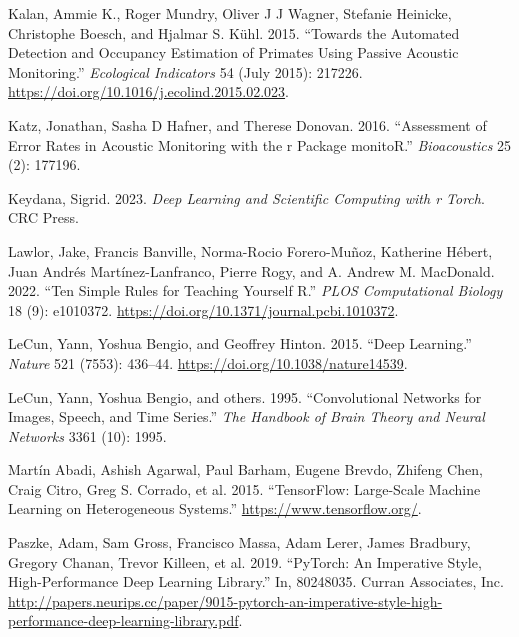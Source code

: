 \documentclass[fleqn,10pt,lineno]{wlpeerj} %
\newlength{\cslhangindent}
\newlength{\cslentryspacingunit} %
\newenvironment{CSLReferences}[2] %
 {%
  \setlength{\parindent}{0pt}
  \ifodd #1
  \let\oldpar\par
  \def\par{\hangindent=\cslhangindent\oldpar}
  \fi
  \setlength{\parskip}{#2\cslentryspacingunit}
 }%
 {}
\begin{document}
\begin{CSLReferences}{1}{0}
\leavevmode{}%
Kalan, Ammie K., Roger Mundry, Oliver J J Wagner, Stefanie Heinicke,
Christophe Boesch, and Hjalmar S. Kühl. 2015. {``Towards the Automated
Detection and Occupancy Estimation of Primates Using Passive Acoustic
Monitoring.''} \emph{Ecological Indicators} 54 (July 2015): 217226.
\url{https://doi.org/10.1016/j.ecolind.2015.02.023}.

\leavevmode{}%
Katz, Jonathan, Sasha D Hafner, and Therese Donovan. 2016. {``Assessment
of Error Rates in Acoustic Monitoring with the r Package monitoR.''}
\emph{Bioacoustics} 25 (2): 177196.

\leavevmode{}%
Keydana, Sigrid. 2023. \emph{Deep Learning and Scientific Computing with
r Torch}. CRC Press.

\leavevmode{}%
Lawlor, Jake, Francis Banville, Norma-Rocio Forero-Muñoz, Katherine
Hébert, Juan Andrés Martínez-Lanfranco, Pierre Rogy, and A. Andrew M.
MacDonald. 2022. {``Ten Simple Rules for Teaching Yourself R.''}
\emph{PLOS Computational Biology} 18 (9): e1010372.
\url{https://doi.org/10.1371/journal.pcbi.1010372}.

\leavevmode{}%
LeCun, Yann, Yoshua Bengio, and Geoffrey Hinton. 2015. {``Deep
Learning.''} \emph{Nature} 521 (7553): 436--44.
\url{https://doi.org/10.1038/nature14539}.

\leavevmode{}%
LeCun, Yann, Yoshua Bengio, and others. 1995. {``Convolutional Networks
for Images, Speech, and Time Series.''} \emph{The Handbook of Brain
Theory and Neural Networks} 3361 (10): 1995.

\leavevmode{}%
Martín Abadi, Ashish Agarwal, Paul Barham, Eugene Brevdo, Zhifeng Chen,
Craig Citro, Greg S. Corrado, et al. 2015. {``TensorFlow: Large-Scale
Machine Learning on Heterogeneous Systems.''}
\url{https://www.tensorflow.org/}.

\leavevmode{}%
Paszke, Adam, Sam Gross, Francisco Massa, Adam Lerer, James Bradbury,
Gregory Chanan, Trevor Killeen, et al. 2019. {``PyTorch: An Imperative
Style, High-Performance Deep Learning Library.''} In, 80248035. Curran
Associates, Inc.
\url{http://papers.neurips.cc/paper/9015-pytorch-an-imperative-style-high-performance-deep-learning-library.pdf}.


\end{CSLReferences}
\end{document}
